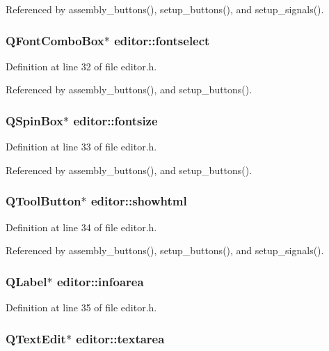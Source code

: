 Referenced by assembly\_\-buttons(), setup\_\-buttons(), and setup\_\-signals().
\subsubsection{\setlength{\rightskip}{0pt plus 5cm}QFont\-Combo\-Box$\ast$ {\bf editor::fontselect}}\label{classeditor_0ba3d8ff00e569fa4facdf27df93448d}




Definition at line 32 of file editor.h.

Referenced by assembly\_\-buttons(), and setup\_\-buttons().
\subsubsection{\setlength{\rightskip}{0pt plus 5cm}QSpin\-Box$\ast$ {\bf editor::fontsize}}\label{classeditor_069a22f3f70c9663478d7d3c70ea990b}




Definition at line 33 of file editor.h.

Referenced by assembly\_\-buttons(), and setup\_\-buttons().
\subsubsection{\setlength{\rightskip}{0pt plus 5cm}QTool\-Button$\ast$ {\bf editor::showhtml}}\label{classeditor_8a785c3a546016d6e2ce87f1ea4a606a}




Definition at line 34 of file editor.h.

Referenced by assembly\_\-buttons(), setup\_\-buttons(), and setup\_\-signals().
\subsubsection{\setlength{\rightskip}{0pt plus 5cm}QLabel$\ast$ {\bf editor::infoarea}}\label{classeditor_fe9011c96ac0dcaad15f477fdd5313c2}




Definition at line 35 of file editor.h.
\subsubsection{\setlength{\rightskip}{0pt plus 5cm}QText\-Edit$\ast$ {\bf editor::textarea}}\label{classeditor_13ad1d8df79f15c932df792f02cd3506}




